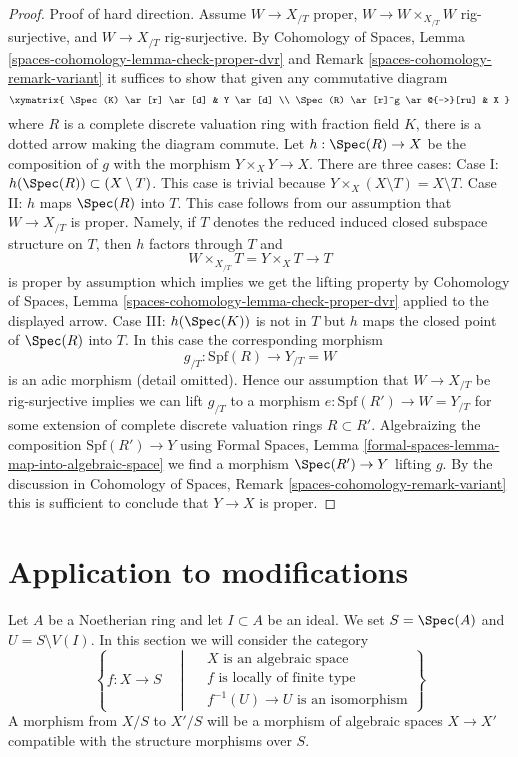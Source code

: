 \begin{proof}
\medskip\noindent
Proof of hard direction. Assume $W \to X_{/T}$ proper,
$W \to W \times_{X_{/T}} W$ rig-surjective, and $W \to X_{/T}$
rig-surjective. By
Cohomology of Spaces, Lemma \ref{spaces-cohomology-lemma-check-proper-dvr} and
Remark \ref{spaces-cohomology-remark-variant}
it suffices to show that given any commutative diagram
$$
\xymatrix{
\Spec(K) \ar[r] \ar[d] & Y \ar[d] \\
\Spec(R) \ar[r]^g \ar@{-->}[ru] & X
}
$$
where $R$ is a complete discrete valuation ring with fraction field $K$,
there is a dotted arrow making the diagram commute. Let
$h : \Spec(R) \to X$ be the composition of $g$ with the morphism
$Y \times_X Y \to X$. There are three cases:
Case I: $h(\Spec(R)) \subset (X \setminus T)$. This case is trivial
because $Y \times_X (X \setminus T) = X \setminus T$.
Case II: $h$ maps $\Spec(R)$ into $T$. This case follows
from our assumption that $W \to X_{/T}$ is proper. Namely,
if $T$ denotes the reduced induced closed subspace structure
on $T$, then $h$ factors through $T$ and
$$
W \times_{X_{/T}} T = Y \times_X T \longrightarrow T
$$
is proper by assumption which implies we get the lifting property by
Cohomology of Spaces, Lemma \ref{spaces-cohomology-lemma-check-proper-dvr}
applied to the displayed arrow. Case III: $h(\Spec(K))$ is not in $T$
but $h$ maps the closed point of $\Spec(R)$ into $T$. In this case
the corresponding morphism
$$
g_{/T} : \text{Spf}(R) \longrightarrow Y_{/T} = W
$$
is an adic morphism (detail omitted). Hence our assumption that
$W \to X_{/T}$ be rig-surjective implies we can lift
$g_{/T}$ to a morphism $e : \text{Spf}(R') \to W = Y_{/T}$
for some extension of complete discrete valuation rings $R \subset R'$.
Algebraizing the composition $\text{Spf}(R') \to Y$ using
Formal Spaces, Lemma \ref{formal-spaces-lemma-map-into-algebraic-space}
we find a morphism $\Spec(R') \to Y$ lifting $g$. By the discussion
in Cohomology of Spaces, Remark \ref{spaces-cohomology-remark-variant}
this is sufficient to conclude that $Y \to X$ is proper.
\end{proof}





\section{Application to modifications}
\label{section-modifications}

\noindent
Let $A$ be a Noetherian ring and let $I \subset A$ be an ideal. We set
$S = \Spec(A)$ and $U = S \setminus V(I)$. In this section
we will consider the category
\begin{equation}
\label{equation-modification}
\left\{
f : X \longrightarrow S
\quad \middle| \quad
\begin{matrix}
X\text{ is an algebraic space}\\
f\text{ is locally of finite type}\\
f^{-1}(U) \to U\text{ is an isomorphism}
\end{matrix}
\right\}
\end{equation}
A morphism from $X/S$ to $X'/S$ will be a morphism of algebraic spaces
$X \to X'$ compatible with the structure morphisms over $S$.

